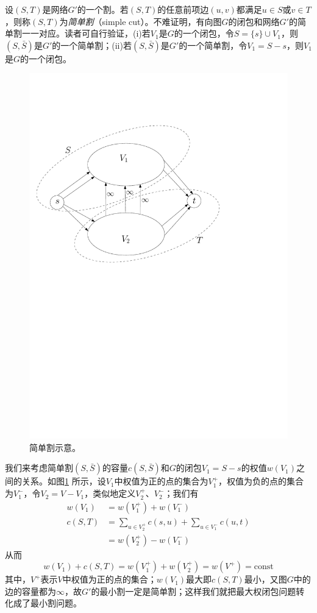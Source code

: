 \documentclass[a4paper]{ctexbook}
\begin{document}
  设$(S,T)$是网络$G'$的一个割。若$(S,T)$的任意前项边$(u,v)$都满足$u\in S$或$v\in T$，则称$(S,T)$为\emph{简单割}（simple cut）。不难证明，有向图$G$的闭包和网络$G'$的简单割一一对应。读者可自行验证，(i)若$V_1$是$G$的一个闭包，令$S=\{s\}\cup V_1$，则$(S,\bar{S})$是$G'$的一个简单割；(ii)若$(S,\bar{S})$是$G'$的一个简单割，令$V_1=S-s$，则$V_1$是$G$的一个闭包。
  \begin{figure}
    \centering
    \includegraphics[scale=0.5]{figures/simple-cut}
    \caption{简单割示意。}
    \label{Fig:simple-cut}
  \end{figure}
  我们来考虑简单割$(S,\bar{S})$的容量$c(S,\bar{S})$和$G$的闭包$V_1=S-s$的权值$w(V_1)$之间的关系。如图\ref{Fig:simple-cut} 所示，设$V_1$中权值为正的点的集合为$V_1^+$，权值为负的点的集合为$V_1^-$，令$V_2=V-V_1$，类似地定义$V_2^+$、$V_2^-$；我们有
  \begin{align*}
    w(V_1) &=w(V_1^+) + w(V_1^-)\\
    c(S,T) &= \sum_{u\in V_2^+}c(s,u) + \sum_{u\in V_1^-}c(u,t)\\
    &= w(V_2^+) - w(V_1^-)
  \end{align*}
  从而
  \[ w(V_1) + c(S,T) = w(V_1^+) + w(V_2^+) = w(V^+)= \mathrm{const}\]
  其中，$V^+$表示$V$中权值为正的点的集合；$w(V_1)$最大即$c(S,T)$最小，又图$G$中的边的容量都为$\infty$，故$G'$的最小割一定是简单割；这样我们就把最大权闭包问题转化成了最小割问题。
\end{document}

